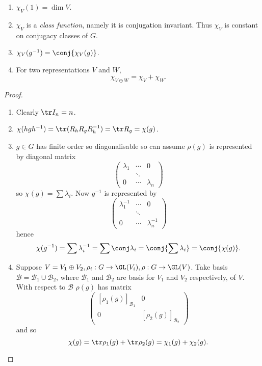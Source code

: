 \documentclass[a4paper]{article}
\theoremstyle{definition}
\begin{document}
\begin{theorem}\leavevmode
  \begin{enumerate}
  \item \(\chi_V(1) = \dim V\).
  \item \(\chi_V\) is a \emph{class function}, namely it is conjugation invariant. Thus \(\chi_V\) is constant on conjugacy classes of \(G\).
  \item \(\chi_V(g^{-1}) = \conj{\chi_V(g)}\).
  \item For two representations \(V\) and \(W\),
    \[
      \chi_{V \oplus W} = \chi_V + \chi_W.
    \]
  \end{enumerate}
\end{theorem}

\begin{proof}\leavevmode
  \begin{enumerate}
  \item Clearly \(\tr I_n = n\).
  \item \(\chi(hgh^{-1}) = \tr(R_hR_gR_h^{-1}) = \tr R_g = \chi(g)\).
  \item \(g \in G\) has finite order so diagonalisable so can assume \(\rho(g)\) is represented by diagonal matrix
    \[
      \begin{pmatrix}
        \lambda_1 & \cdots & 0 \\
        & \ddots \\
        0 & \cdots & \lambda_n
      \end{pmatrix}
    \]
    so \(\chi(g) = \sum \lambda_i\). Now \(g^{-1}\) is represented by
    \[
      \begin{pmatrix}
        \lambda_1^{-1} & \cdots & 0 \\
        & \ddots \\
        0 & \cdots & \lambda_n^{-1}
      \end{pmatrix}
    \] 
    hence
    \[
      \chi(g^{-1}) = \sum \lambda_i^{-1} = \sum \conj \lambda_i = \conj{\sum \lambda_i} = \conj{\chi(g)}.
    \]
  \item Suppose \(V = V_1 \oplus V_2, \rho_i: G \to \GL(V_i), \rho: G \to \GL(V)\). Take basis \(\mathcal B = \mathcal B_1 \cup \mathcal B_2\), where \(\mathcal B_1\) and \(\mathcal B_2\) are basis for \(V_1\) and \(V_2\) respectively, of \(V\). With respect to \(\mathcal B\) \(\rho(g)\) has matrix
    \[
      \begin{pmatrix}
        [\rho_1(g)]_{\mathcal B_1} & 0 \\
        0 & [\rho_2(g)]_{\mathcal B_2}
      \end{pmatrix}
    \]
    and so
    \[
      \chi(g) = \tr \rho_1(g) + \tr \rho_2(g) = \chi_1(g) + \chi_2(g).
    \]
  \end{enumerate}
\end{proof}
\end{document}
